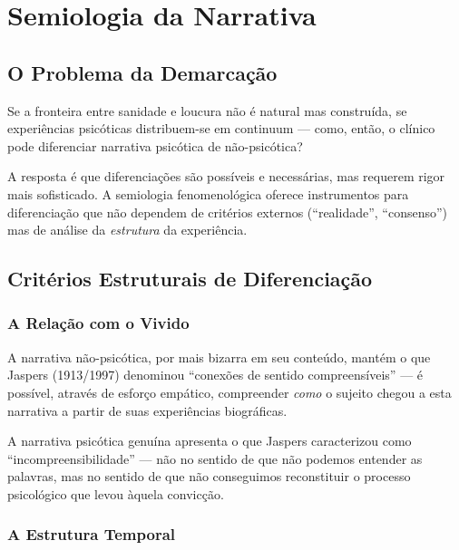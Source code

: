\section{Semiologia da Narrativa}
\label{sec:semiologia-narrativa}

\subsection{O Problema da Demarcação}

Se a fronteira entre sanidade e loucura não é natural mas construída, se experiências psicóticas distribuem-se em continuum --- como, então, o clínico pode diferenciar narrativa psicótica de não-psicótica?

A resposta é que diferenciações são possíveis e necessárias, mas requerem rigor mais sofisticado. A semiologia fenomenológica oferece instrumentos para diferenciação que não dependem de critérios externos (\enquote{realidade}, \enquote{consenso}) mas de análise da \textit{estrutura} da experiência.

\subsection{Critérios Estruturais de Diferenciação}

\subsubsection{A Relação com o Vivido}

A narrativa não-psicótica, por mais bizarra em seu conteúdo, mantém o que Jaspers (1913/1997) denominou \enquote{conexões de sentido compreensíveis} --- é possível, através de esforço empático, compreender \textit{como} o sujeito chegou a esta narrativa a partir de suas experiências biográficas.

A narrativa psicótica genuína apresenta o que Jaspers caracterizou como \enquote{incompreensibilidade} --- não no sentido de que não podemos entender as palavras, mas no sentido de que não conseguimos reconstituir o processo psicológico que levou àquela convicção.

\subsubsection{A Estrutura Temporal}

